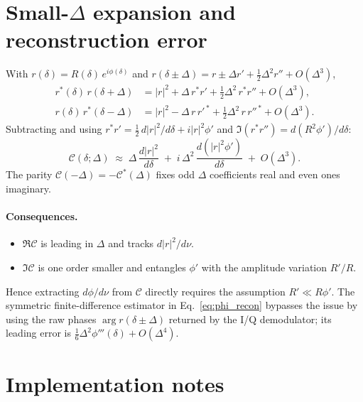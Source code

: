 \documentclass[aps,pra, onecolumn,superscriptaddress,nopacs,floatfix, showkeys, notitlepage]{revtex4-1}
\begin{document}
\section{Small-$\Delta$ expansion and reconstruction error}
\label{app:smalldelta}

With $r(\delta) = R(\delta)\,e^{i\phi(\delta)}$ and
$r(\delta\pm\Delta) = r \pm \Delta r' + \tfrac12 \Delta^2 r'' + O(\Delta^3)$,
\begin{align}
    r^*(\delta)\,r(\delta+\Delta)
    &= |r|^2 + \Delta\, r^* r' + \tfrac{1}{2}\Delta^2\, r^* r'' + O(\Delta^3),\\
    r(\delta)\,r^*(\delta-\Delta)
    &= |r|^2 - \Delta\, r\, r'^{\,*} + \tfrac{1}{2}\Delta^2\, r\, r''^{\,*} + O(\Delta^3).
\end{align}
Subtracting and using $r^* r' = \tfrac{1}{2}\,d|r|^2/d\delta + i|r|^2\phi'$
and $\Im(r^* r'') = d(R^2\phi')/d\delta$:
\begin{equation}
    \mathcal{C}(\delta;\Delta)
    \;\approx\; \Delta\,\frac{d|r|^2}{d\delta}
    \;+\; i\,\Delta^2\,\frac{d(|r|^2\phi')}{d\delta}
    \;+\; O(\Delta^3).
    \label{eq:C_small}
\end{equation}
The parity $\mathcal{C}(-\Delta) = -\mathcal{C}^*(\Delta)$ fixes odd
$\Delta$ coefficients real and even ones imaginary.

\paragraph{Consequences.}
\begin{itemize}\setlength\itemsep{2pt}
  \item $\Re\mathcal{C}$ is leading in $\Delta$ and tracks $d|r|^2/d\nu$.
  \item $\Im\mathcal{C}$ is one order smaller and entangles $\phi'$ with the
        amplitude variation $R'/R$.
\end{itemize}
Hence extracting $d\phi/d\nu$ from $\mathcal{C}$ directly requires the
assumption $R' \ll R\phi'$. The symmetric finite-difference estimator in
Eq.~\eqref{eq:phi_recon} bypasses the issue by using the raw phases
$\arg r(\delta\pm\Delta)$ returned by the I/Q demodulator; its leading
error is $\tfrac{1}{6}\Delta^2\phi'''(\delta) + O(\Delta^4)$.

\section{Implementation notes}
\label{app:impl}
\end{document}
